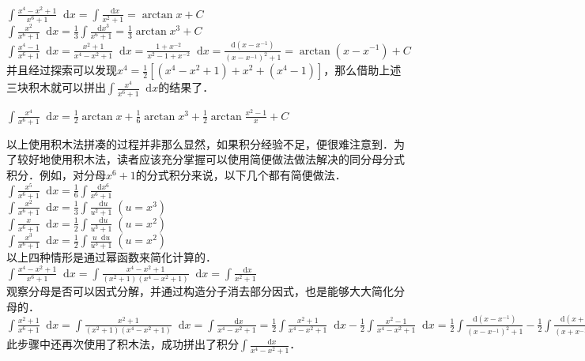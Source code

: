 \documentclass{ctexbook}
\newcommand*{\dif}{\mathop{}\!\mathrm{d}}
\begin{document}
$\int\frac{x^{4}-x^{2}+1}{x^{6}+1}\dif{x}=\int\frac{\dif{x}}{x^{2}+1}=\arctan{x}+C$\\
$\int\frac{x^{2}}{x^{6}+1}\dif{x}=\frac{1}{3}\int\frac{\dif{x}^{3}}{x^{6}+1}=\frac{1}{3}\arctan{x^{3}}+C$\\
$\int\frac{x^{4}-1}{x^{6}+1}\dif{x}=\frac{x^{2}+1}{x^{4}-x^{2}+1}\dif{x}=\frac{1+x^{-2}}{x^{2}-1+x^{-2}}\dif{x}=\frac{\mathrm{d}\left(x-x^{-1}\right)}{\left(x-x^{-1}\right)^{2}+1}=\arctan{\left(x-x^{-1}\right)}+C$\\
并且经过探索可以发现$x^{4}=\frac{1}{2}\left[\left(x^{4}-x^{2}+1\right)+x^{2}+\left(x^{4}-1\right)\right]$，那么借助上述三块积木就可以拼出$\int\frac{x^{4}}{x^{6}+1}\dif{x}$的结果了．\par
$\int\frac{x^{4}}{x^{6}+1}\dif{x}=\frac{1}{2}\arctan{x}+\frac{1}{6}\arctan{x^{3}}+\frac{1}{2}\arctan{\frac{x^{2}-1}{x}}+C$\par
以上使用积木法拼凑的过程并非那么显然，如果积分经验不足，便很难注意到．为了较好地使用积木法，读者应该充分掌握可以使用简便做法做法解决的同分母分式积分．例如，对分母$x^{6}+1$的分式积分来说，以下几个都有简便做法．\\
$\int\frac{x^{5}}{x^{6}+1}\dif{x}=\frac{1}{6}\int\frac{\dif{x}^{6}}{x^{6}+1}$\\
$\int\frac{x^{2}}{x^{6}+1}\dif{x}=\frac{1}{3}\int\frac{\dif{u}}{u^{2}+1}\;\left(u=x^{3}\right)$\\
$\int\frac{x}{x^{6}+1}\dif{x}=\frac{1}{2}\int\frac{\dif{u}}{u^{3}+1}\;\left(u=x^{2}\right)$\\
$\int\frac{x^{3}}{x^{6}+1}\dif{x}=\frac{1}{2}\int\frac{u\dif{u}}{u^{3}+1}\;\left(u=x^{2}\right)$\\
以上四种情形是通过幂函数来简化计算的．\\
$\int\frac{x^{4}-x^{2}+1}{x^{6}+1}\dif{x}=\int\frac{x^{4}-x^{2}+1}{\left(x^{2}+1\right)\left(x^{4}-x^{2}+1\right)}\dif{x}=\int\frac{\dif{x}}{x^{2}+1}$\\
观察分母是否可以因式分解，并通过构造分子消去部分因式，也是能够大大简化分母的．\\
$\int\frac{x^{2}+1}{x^{6}+1}\dif{x}=\int\frac{x^{2}+1}{\left(x^{2}+1\right)\left(x^{4}-x^{2}+1\right)}\dif{x}=\int\frac{\dif{x}}{x^{4}-x^{2}+1}=\frac{1}{2}\int\frac{x^{2}+1}{x^{4}-x^{2}+1}\dif{x}-\frac{1}{2}\int\frac{x^{2}-1}{x^{4}-x^{2}+1}\dif{x}=\frac{1}{2}\int\frac{\mathrm{d}\left(x-x^{-1}\right)}{\left(x-x^{-1}\right)^{2}+1}-\frac{1}{2}\int\frac{\mathrm{d}\left(x+x^{-1}\right)}{\left(x+x^{-1}\right)^{2}-3}$\\
此步骤中还再次使用了积木法，成功拼出了积分$\int\frac{\dif{x}}{x^{4}-x^{2}+1}$．\\
\end{document}
